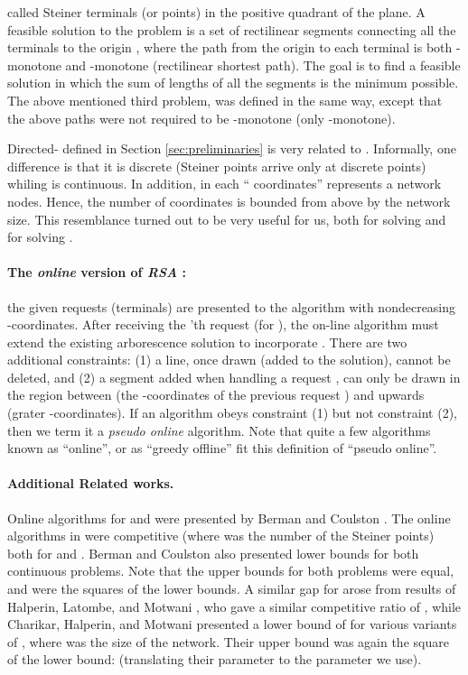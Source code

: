\documentclass[11pt]{article}
\begin{document}
called Steiner terminals (or points) in the positive quadrant of the plane.
A feasible solution  to the problem is a set of rectilinear segments connecting all the  terminals to the origin ,
where the path from the origin to each
terminal is both -monotone and -monotone (rectilinear shortest path).
The goal is to find a feasible solution in which the sum of lengths of all the segments is the minimum possible.
The above mentioned third problem, 
was defined in the same way, except that the above paths were not required to be -monotone (only -monotone).

Directed- defined in Section \ref{sec:preliminaries} is very related to .
Informally, one difference is that it is discrete (Steiner points arrive only at discrete points) whiling  is continuous.
In addition, in  each `` coordinates''  represents a network nodes.
Hence, the number of  coordinates is bounded from above by the network size.
This resemblance turned out to be very useful for us, both for solving  and for solving .


\paragraph*{The {\em online} version of {\em RSA} \cite{berman}:}
the given requests (terminals) are presented to the algorithm with nondecreasing
-coordinates.
After receiving the 'th request  (for ),
the on-line  algorithm must extend the existing arborescence solution to incorporate .
There are two additional constraints:
(1) a line, once drawn (added to the solution), cannot be deleted,
and
(2) a segment added when handling a request , can
only be drawn in the region between  (the -coordinates of the previous request ) and upwards
(grater -coordinates).
If an algorithm obeys constraint (1) but not constraint (2), then we term it a {\em pseudo online} algorithm.
Note that quite a few algorithms known as ``online'', or as ``greedy offline'' fit this definition of ``pseudo online''.




\paragraph*{Additional Related works.}
Online algorithms for  and  were presented by Berman and Coulston \cite{berman}.
The online algorithms in \cite{berman} were  competitive (where  was the number of the Steiner points) both for  and .
Berman and Coulston also presented  lower bounds for both continuous problems.
Note that the upper bounds for both problems were equal, and were the squares of the lower bounds.
A similar gap for  arose from results of Halperin, Latombe, and  Motwani \cite{halperin1}, who gave a similar  competitive ratio of ,
while  Charikar, Halperin,  and Motwani \cite{halperin} presented a lower bound of   for various variants of ,  where  was the size of the network.
Their upper bound was again the square of the lower bound:
  (translating their parameter  to the parameter  we use).
\end{document}
